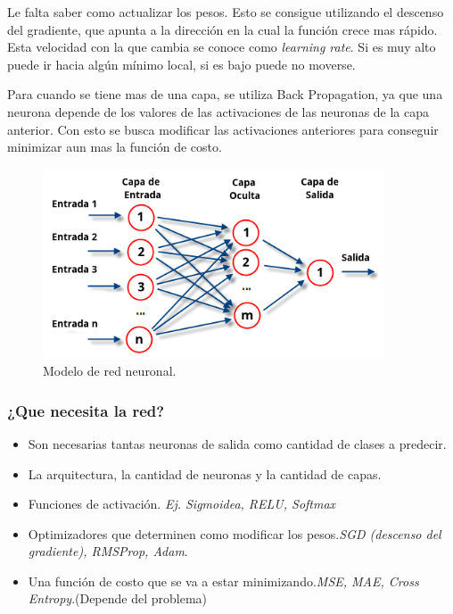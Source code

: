 \documentclass[titlepage,a4paper]{article}
\begin{document}
Le falta saber como actualizar los pesos. Esto se consigue utilizando el descenso del gradiente, que apunta a la dirección en la cual la función crece mas rápido. Esta velocidad con la que cambia se conoce como \textit{learning rate}. Si es muy alto puede ir hacia algún mínimo local, si es bajo puede no moverse.

Para cuando se tiene mas de una capa, se utiliza Back Propagation, ya que una neurona depende de los valores de las activaciones de las neuronas de la capa anterior. Con esto se busca modificar las activaciones anteriores para conseguir minimizar aun mas la función de costo.

\begin{figure}[!htb]
    \centering
    \includegraphics[width=0.9\textwidth]{imagenesResumen/RedNeuronal.png}
    \caption{Modelo de red neuronal.}
\end{figure}

\subsubsection*{¿Que necesita la red?}
\begin{itemize}
    \item Son necesarias tantas neuronas de salida como cantidad de clases a predecir.
    \item La arquitectura, la cantidad de neuronas y la cantidad de capas.
    \item Funciones de activación. \textit{Ej. Sigmoidea, RELU, Softmax}
    \item Optimizadores que determinen como modificar los pesos.\textit{SGD (descenso del gradiente), RMSProp, Adam}.
    \item Una función de costo que se va a estar minimizando.\textit{MSE, MAE, Cross Entropy}.(Depende del problema)
\end{itemize}
\end{document}

